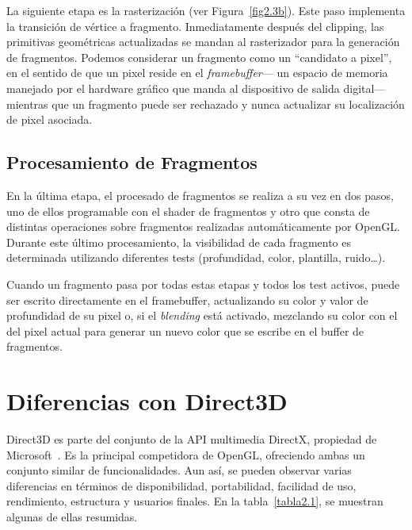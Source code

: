La siguiente etapa es la rasterización (ver Figura~\ref{fig2.3b}). Este paso
implementa la transición de vértice a fragmento. Inmediatamente después del
clipping, las primitivas geométricas actualizadas se mandan al rasterizador para
la generación de fragmentos. Podemos considerar un fragmento como un ``candidato
a pixel'', en el sentido de que un pixel reside en el \textit{framebuffer}--- un
espacio de memoria manejado por el hardware gráfico que manda al dispositivo de
salida digital--- mientras que un fragmento puede ser rechazado y nunca
actualizar su localización de pixel asociada. 

\subsection{Procesamiento de Fragmentos}
\label{ref:procesamientofrags}

En la última etapa, el procesado de fragmentos se realiza a su vez en dos pasos,
uno de ellos programable con el shader de fragmentos y otro que consta de
distintas operaciones sobre fragmentos realizadas automáticamente por OpenGL.
Durante este último procesamiento, la visibilidad de cada fragmento es
determinada utilizando diferentes tests (profundidad, color, plantilla,
ruido\ldots). 

Cuando un fragmento pasa por todas estas etapas y todos los test activos, puede
ser escrito directamente en el framebuffer, actualizando su color y valor de
profundidad de su pixel o, si el \textit{blending} está activado, mezclando su
color con el del pixel actual para generar un nuevo color que se escribe en el
buffer de fragmentos.

\section{Diferencias con Direct3D}
\label{makereference2.4}

Direct3D es parte del conjunto de la API multimedia DirectX, propiedad de
Microsoft~\cite{Microsoft}. Es la principal competidora de OpenGL, ofreciendo
ambas un conjunto similar de funcionalidades. Aun así, se pueden observar varias
diferencias en términos de disponibilidad, portabilidad, facilidad de uso,
rendimiento, estructura y usuarios finales. En la tabla~\ref{tabla2.1}, se
muestran algunas de ellas resumidas.

